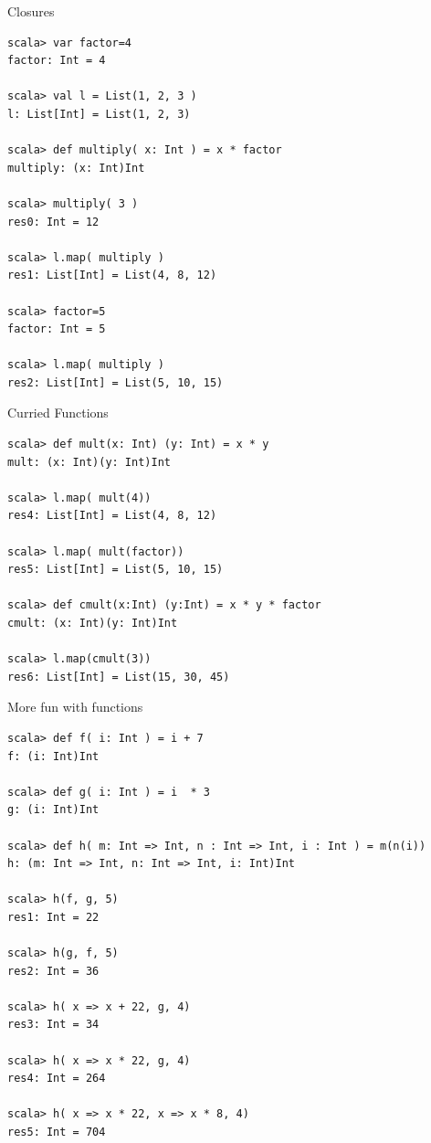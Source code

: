 \documentclass[t]{beamer}
\begin{document}
\begin{frame}[fragile]{Closures}
  \begin{tiny}
  \begin{verbatim}
scala> var factor=4
factor: Int = 4

scala> val l = List(1, 2, 3 )
l: List[Int] = List(1, 2, 3)

scala> def multiply( x: Int ) = x * factor
multiply: (x: Int)Int

scala> multiply( 3 )
res0: Int = 12

scala> l.map( multiply )
res1: List[Int] = List(4, 8, 12)

scala> factor=5
factor: Int = 5

scala> l.map( multiply )
res2: List[Int] = List(5, 10, 15)
  \end{verbatim}
  \end{tiny}
\end{frame}

\begin{frame}[fragile]{Curried Functions}
  \begin{tiny}
  \begin{verbatim}
scala> def mult(x: Int) (y: Int) = x * y
mult: (x: Int)(y: Int)Int

scala> l.map( mult(4))
res4: List[Int] = List(4, 8, 12)

scala> l.map( mult(factor))
res5: List[Int] = List(5, 10, 15)

scala> def cmult(x:Int) (y:Int) = x * y * factor
cmult: (x: Int)(y: Int)Int

scala> l.map(cmult(3))
res6: List[Int] = List(15, 30, 45)
  \end{verbatim}
  \end{tiny}
\end{frame}

\begin{frame}[fragile]{More fun with functions}
  \begin{tiny}
  \begin{verbatim}
scala> def f( i: Int ) = i + 7
f: (i: Int)Int

scala> def g( i: Int ) = i  * 3
g: (i: Int)Int

scala> def h( m: Int => Int, n : Int => Int, i : Int ) = m(n(i))
h: (m: Int => Int, n: Int => Int, i: Int)Int

scala> h(f, g, 5)
res1: Int = 22

scala> h(g, f, 5)
res2: Int = 36

scala> h( x => x + 22, g, 4)
res3: Int = 34

scala> h( x => x * 22, g, 4)
res4: Int = 264

scala> h( x => x * 22, x => x * 8, 4)
res5: Int = 704
  \end{verbatim}
  \end{tiny}
  \note{}
\end{frame}
\end{document}
